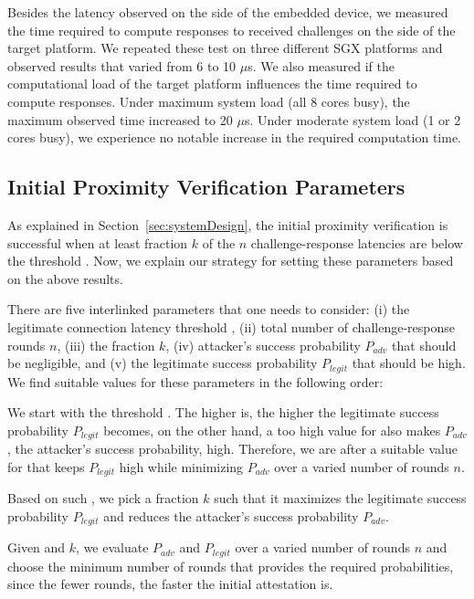 Besides the latency observed on the side of the embedded device, we measured the time required to compute responses to received challenges on the side of the target platform. We repeated these test on three different SGX platforms and observed results that varied from 6 to 10 $\mu$s. We also measured if the computational load of the target platform influences the time required to compute responses. Under maximum system load (all 8 cores busy), the maximum observed time increased to 20 $\mu$s. Under moderate system load (1 or 2 cores busy), we experience no notable increase in the required computation time. 


\subsection{Initial Proximity Verification Parameters}
\label{sec:evaluation:parameters}

As explained in Section~\ref{sec:systemDesign}, the initial proximity verification is successful when at least fraction $k$ of the $n$ challenge-response latencies are below the threshold \connect.  Now, we explain our strategy for setting these parameters based on the above results.

There are five interlinked parameters that one needs to consider: (i) the legitimate connection latency threshold \connect, (ii) total number of challenge-response rounds $n$, (iii) the fraction $k$, (iv) attacker's success probability $P_{adv}$ that should be negligible, and (v) the legitimate success probability $P_{legit}$ that should be high. We find suitable values for these parameters in the following order:

\begin{mylist}

  \item We start with the threshold \connect. The higher \connect is, the higher the legitimate success probability $P_{legit}$ becomes, on the other hand, a too high value for \connect also makes $P_{adv}$, the attacker's success probability, high. Therefore, we are after a suitable value for \connect that keeps $P_{legit}$ high while minimizing $P_{adv}$ over a varied number of rounds $n$. 

  \item Based on such \connect, we pick a fraction $k$ such that it maximizes the legitimate success probability $P_{legit}$ and reduces the attacker's success probability $P_{adv}$. 

  \item Given \connect and $k$, we evaluate $P_{adv}$ and $P_{legit}$ over a varied number of rounds $n$ and choose the minimum number of rounds that provides the required probabilities, since the fewer rounds, the faster the initial attestation is.
\end{mylist}


